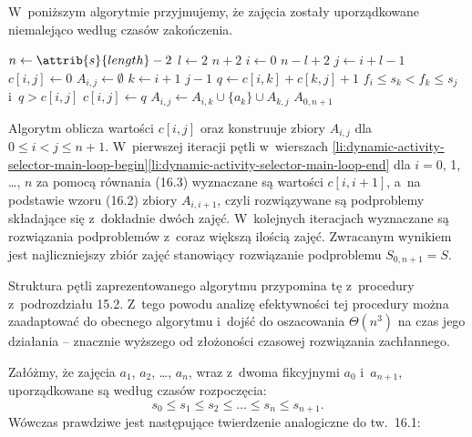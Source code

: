\bignegskip

\exercise %
W~poniższym algorytmie przyjmujemy, że zajęcia zostały uporządkowane niemalejąco według czasów zakończenia.
\begin{codebox}
\li	$n\gets\attrib{s}{length}-2$
\li	\For $l\gets2$ \To $n+2$ \label{li:dynamic-activity-selector-main-loop-begin}
\li		\Do \For $i\gets0$ \To $n-l+2$
\li				\Do $j\gets i+l-1$
\li					$c[i,j]\gets0$
\li					$A_{i,j}\gets\emptyset$
\li					\For $k\gets i+1$ \To $j-1$
\li						\Do $q\gets c[i,k]+c[k,j]+1$
\li							\If $f_i\le s_k<f_k\le s_j$ i~$q>c[i,j]$
\li								\Then $c[i,j]\gets q$
\li									$A_{i,j}\gets A_{i,k}\cup\{a_k\}\cup A_{k,j}$
								\End
						\End
				\End
		\End \label{li:dynamic-activity-selector-main-loop-end}
\li	\Return $A_{0,n+1}$
\end{codebox}
Algorytm oblicza wartości $c[i,j]$ oraz konstruuje zbiory $A_{i,j}$ dla $0\le i<j\le n+1$.
W~pierwszej iteracji pętli  w~wierszach \ref{li:dynamic-activity-selector-main-loop-begin}\nbendash\ref{li:dynamic-activity-selector-main-loop-end} dla $i=0$, 1, \dots, $n$ za pomocą równania (16.3) wyznaczane są wartości $c[i,i+1]$, a~na podstawie wzoru (16.2) zbiory $A_{i,i+1}$, czyli rozwiązywane są podproblemy składające się z~dokładnie dwóch zajęć.
W~kolejnych iteracjach wyznaczane są rozwiązania podproblemów z~coraz większą ilością zajęć.
Zwracanym wynikiem jest najliczniejszy zbiór zajęć stanowiący rozwiązanie podproblemu $S_{0,n+1}=S$.

Struktura pętli zaprezentowanego algorytmu przypomina tę z~procedury  z~podrozdziału 15.2.
Z~tego powodu analizę efektywności tej procedury można zaadaptować do obecnego algorytmu i~dojść do oszacowania $\Theta(n^3)$ na czas jego działania -- znacznie wyższego od złożoności czasowej rozwiązania zachłannego.

\exercise %
Załóżmy, że zajęcia $a_1$, $a_2$, \dots, $a_n$, wraz z~dwoma fikcyjnymi $a_0$ i~$a_{n+1}$, uporządkowane są według czasów rozpoczęcia:
\[
	s_0 \le s_1 \le s_2 \le \dots \le s_n \le s_{n+1}.
\]
Wówczas prawdziwe jest następujące twierdzenie analogiczne do tw.\ 16.1:

